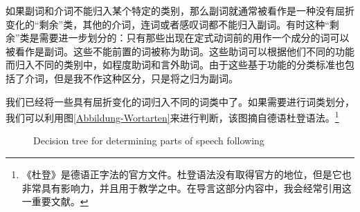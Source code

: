 如果副词和介词不能归入某个特定的类别，那么副词就通常被看作是一种没有屈折变化的“剩余”类，其他的介词，连词或者感叹词都不能归入副词。有时这种“剩余”类是需要进一步划分的：只有那些出现在定式动词前的用作一个成分的词可以被看作是副词。这些不能前置的词被称为助词。这些助词可以根据他们不同的功能而归入不同的类别中，如程度助词和言外助词。由于这些基于功能的分类标准也包括了介词，但是我不作这种区分，只是将之归为副词。

我们已经将一些具有屈折变化的词归入不同的词类中了。如果需要进行词类划分，我们可以利用图\vref{Abbildung-Wortarten}来进行判断，该图摘自德语杜登语法\citep[]{Duden2005-Authors}。\footnote{《杜登》是德语正字法的官方文件。杜登语法没有取得官方的地位，但是它也非常具有影响力，并且用于教学之中。在导言这部分内容中，我会经常引用这一重要文献。}
\begin{figure}
\centering
\caption{\label{Abbildung-Wortarten}Decision tree for determining parts of speech following }
\end{figure}


